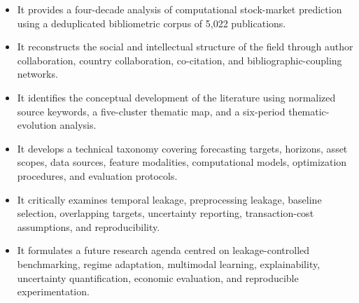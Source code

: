 \documentclass[pdflatex,sn-mathphys-num]{sn-jnl}%
\theoremstyle{thmstyleone}%
\theoremstyle{thmstyletwo}%
\theoremstyle{thmstylethree}%
\begin{document}
\begin{itemize}
    \item It provides a four-decade analysis of computational stock-market
    prediction using a deduplicated bibliometric corpus of 5,022
    publications.

    \item It reconstructs the social and intellectual structure of the field
    through author collaboration, country collaboration, co-citation, and
    bibliographic-coupling networks.

    \item It identifies the conceptual development of the literature using
    normalized source keywords, a five-cluster thematic map, and a
    six-period thematic-evolution analysis.

    \item It develops a technical taxonomy covering forecasting targets,
    horizons, asset scopes, data sources, feature modalities, computational
    models, optimization procedures, and evaluation protocols.

    \item It critically examines temporal leakage, preprocessing leakage,
    baseline selection, overlapping targets, uncertainty reporting,
    transaction-cost assumptions, and reproducibility.

    \item It formulates a future research agenda centred on leakage-controlled
    benchmarking, regime adaptation, multimodal learning, explainability,
    uncertainty quantification, economic evaluation, and reproducible
    experimentation.
\end{itemize}
\end{document}
